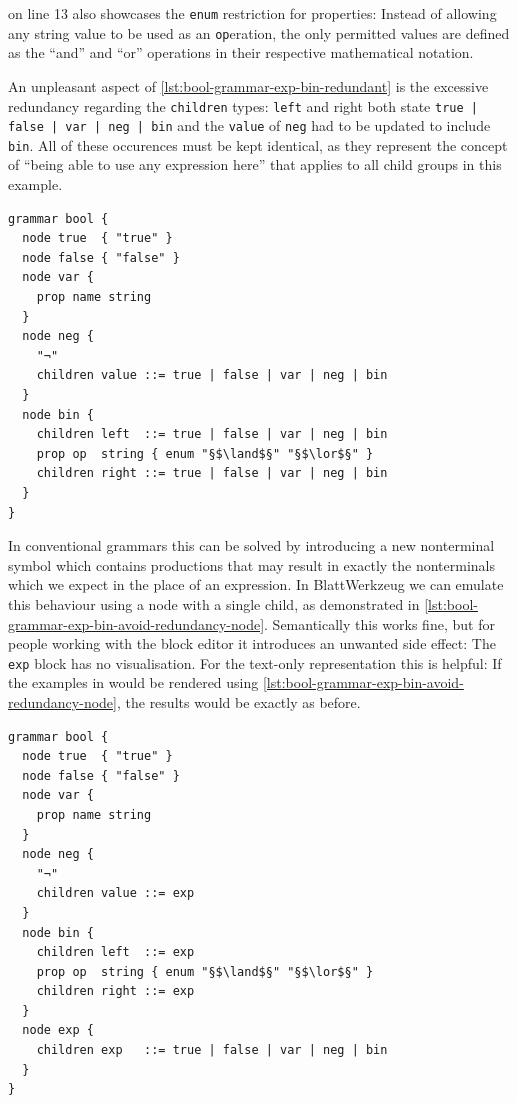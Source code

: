 \documentclass[]{report}
\begin{document}
 on line 13 also showcases the \texttt{enum} restriction for properties: Instead of allowing any string value to be used as an \texttt{op}eration, the only permitted values are defined as the \enquote{and} and \enquote{or} operations in their respective mathematical notation.

An unpleasant aspect of \cref{lst:bool-grammar-exp-bin-redundant} is the excessive redundancy regarding the \texttt{children} types: \texttt{left} and \textrm{right} both state \texttt{true | false | var | neg | bin} and the \texttt{value} of \texttt{neg} had to be updated to include \texttt{bin}. All of these occurences must be kept identical, as they represent the concept of \enquote{being able to use any expression here} that applies to all child groups in this example.

\begin{listing}[H]
\begin{verbatim}
grammar bool {
  node true  { "true" }
  node false { "false" }
  node var {
    prop name string
  }
  node neg {
    "¬"
    children value ::= true | false | var | neg | bin
  }
  node bin {
    children left  ::= true | false | var | neg | bin
    prop op  string { enum "§$\land$§" "§$\lor$§" }
    children right ::= true | false | var | neg | bin
  }
}
\end{verbatim}
\caption{Boolean Expression Grammar: Unary and Binary expressions with redundancy}
\label{lst:bool-grammar-exp-bin-redundant}
\end{listing}

In conventional grammars this can be solved by introducing a new nonterminal symbol which contains productions that may result in exactly the nonterminals which we expect in the place of an expression. In Blatt\-Werkzeug we can emulate this behaviour using a node with a single child, as demonstrated in \cref{lst:bool-grammar-exp-bin-avoid-redundancy-node}. Semantically this works fine, but for people working with the block editor it introduces an unwanted side effect: The \texttt{exp} block has no visualisation. For the text-only representation this is helpful: If the examples in  would be rendered using \cref{lst:bool-grammar-exp-bin-avoid-redundancy-node}, the results would be exactly as before.

\begin{listing}[H]
\begin{verbatim}
grammar bool {
  node true  { "true" }
  node false { "false" }
  node var {
    prop name string
  }
  node neg {
    "¬"
    children value ::= exp
  }
  node bin {
    children left  ::= exp
    prop op  string { enum "§$\land$§" "§$\lor$§" }
    children right ::= exp
  }
  node exp {
    children exp   ::= true | false | var | neg | bin
  }
}
\end{verbatim}
\caption{Boolean Expression Grammar: Unary and Binary expressions with node to avoid redundancy}
\label{lst:bool-grammar-exp-bin-avoid-redundancy-node}
\end{listing}
\end{document}
